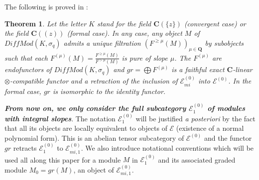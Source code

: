\documentclass[english]{smfart}
\newtheorem{thm}{Theorem}[section]
\numberwithin{equation}{thm}
\def\sq{\sigma_q}
\def\C{{\mathbf C}}
\def\Q{{\mathbf Q}}
\def\EE{{\mathcal{E}}}
\def\Ka{{\C(\{z\})}}
\def\Kf{{\C((z))}}
\def\DM{{DiffMod(K,\sq)}}
\begin{document}
The following is proved in \cite{JSFIL}:

\begin{thm}
Let the letter $K$ stand for the field $\Ka$ (convergent case)
or the field $\Kf$ (formal case). In any case, any object $M$ of $\DM$ 
admits a unique filtration $(F^{\geq \mu}(M))_{\mu \in \Q}$ by subobjects
such that each $F^{(\mu)}(M) = \frac{F^{\geq \mu}(M)}{F^{> \mu}(M)}$ is pure
of slope $\mu$. The $F^{(\mu)}$ are endofunctors of $\DM$ and
$gr = \bigoplus F^{(\mu)}$ is a faithful exact $\C$-linear 
$\otimes$-compatible functor and a retraction of the inclusion 
of $\EE_{mi}^{(0)}$ into $\EE^{(0)}$. In the formal case, $gr$ is isomorphic
to the identity functor.
\end{thm}

\emph{\textbf{From now on, we only consider the full subcategory
$\EE_{1}^{(0)}$ of modules with integral slopes}}.
The notation $\EE_{1}^{(0)}$ will be justified \emph{a posteriori}
by the fact that all its objects are locally equivalent to objects
of $\EE$ (existence of a normal polynomial form).
This is an abelian tensor subcategory of $\EE^{(0)}$ and the functor 
$gr$ retracts $\EE_{1}^{(0)}$ to $\EE_{mi,1}^{(0)}$. 
We also introduce notational conventions which will be used all along 
this paper for a module $M$ in $\EE_{1}^{(0)}$ and its associated graded
module $M_{0} = gr(M)$, an object of $\EE_{mi,1}^{(0)}$. \\
\end{document}
